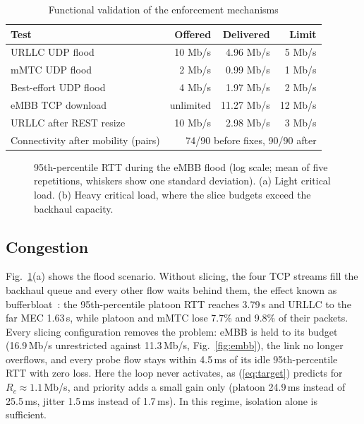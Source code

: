 \documentclass[conference]{IEEEtran}
\begin{document}
\begin{table}[t]
\centering
\caption{Functional validation of the enforcement mechanisms}
\label{tab:func}
\footnotesize
\setlength{\tabcolsep}{4pt}
\begin{tabular}{@{}lrrr@{}}
\toprule
Test & Offered & Delivered & Limit \\
\midrule
URLLC UDP flood & 10 Mb/s & 4.96 Mb/s & 5 Mb/s \\
mMTC UDP flood & 2 Mb/s & 0.99 Mb/s & 1 Mb/s \\
Best-effort UDP flood & 4 Mb/s & 1.97 Mb/s & 2 Mb/s \\
eMBB TCP download & unlimited & 11.27 Mb/s & 12 Mb/s \\
URLLC after REST resize & 10 Mb/s & 2.98 Mb/s & 3 Mb/s \\
\midrule
Connectivity after mobility (pairs) & \multicolumn{3}{r}{74/90 before fixes, 90/90 after} \\
\bottomrule
\end{tabular}
\end{table}

\begin{figure}[t]
\centering

\caption{95th-percentile RTT during the eMBB flood (log scale; mean of five repetitions, whiskers show one standard deviation). (a) Light critical load. (b) Heavy critical load, where the slice budgets exceed the backhaul capacity.}
\label{fig:rtt}
\end{figure}

\subsection{Congestion}
Fig.~\ref{fig:rtt}(a) shows the flood scenario. Without slicing, the four TCP streams fill the backhaul queue and every other flow waits behind them, the effect known as bufferbloat~\cite{gettys2012bufferbloat}: the 95th-percentile platoon RTT reaches 3.79\,s and URLLC to the far MEC 1.63\,s, while platoon and mMTC lose 7.7\% and 9.8\% of their packets. Every slicing configuration removes the problem: eMBB is held to its budget (16.9\,Mb/s unrestricted against 11.3\,Mb/s, Fig.~\ref{fig:embb}), the link no longer overflows, and every probe flow stays within 4.5\,ms of its idle 95th-percentile RTT with zero loss. Here the loop never activates, as (\ref{eq:target}) predicts for $R_c \approx 1.1$\,Mb/s, and priority adds a small gain only (platoon 24.9\,ms instead of 25.5\,ms, jitter 1.5\,ms instead of 1.7\,ms). In this regime, isolation alone is sufficient.
\end{document}
